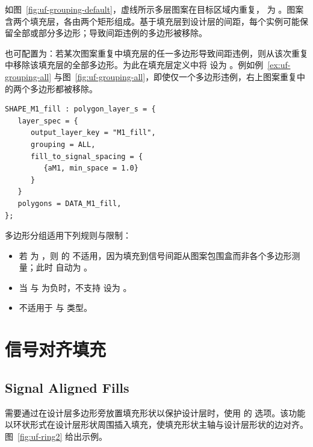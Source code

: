 如图~\ref{fig:uf-grouping-default}，虚线所示多层图案在目标区域内重复， 为 。图案含两个填充层，各由两个矩形组成。基于填充层到设计层的间距，每个实例可能保留全部或部分多边形；导致间距违例的多边形被移除。


也可配置为：若某次图案重复中填充层的任一多边形导致间距违例，则从该次重复中移除该填充层的全部多边形。为此在填充层定义中将  设为 。例如例~\ref{ex:uf-grouping-all} 与图~\ref{fig:uf-grouping-all}，即使仅一个多边形违例，右上图案重复中  的两个多边形都被移除。

\begin{lstlisting}[style=pxl,caption={grouping = ALL 示例},label={ex:uf-grouping-all}]
SHAPE_M1_fill : polygon_layer_s = {
   layer_spec = {
      output_layer_key = "M1_fill",
      grouping = ALL,
      fill_to_signal_spacing = {
         {aM1, min_space = 1.0}
      }
   }
   polygons = DATA_M1_fill,
};
\end{lstlisting}


多边形分组适用下列规则与限制：
\begin{itemize}
  \item 若  为 ，则  的  不适用，因为填充到信号间距从图案包围盒而非各个多边形测量；此时  自动为 。
  \item 当  与  为负时，不支持  设为 。
  \item {} 不适用于  与  类型。
\end{itemize}

\section{信号对齐填充}
\subsection*{Signal Aligned Fills}

需要通过在设计层多边形旁放置填充形状以保护设计层时，使用  的  选项。该功能以环状形式在设计层形状周围插入填充，使填充形状主轴与设计层形状的边对齐。图~\ref{fig:uf-ring2} 给出示例。

